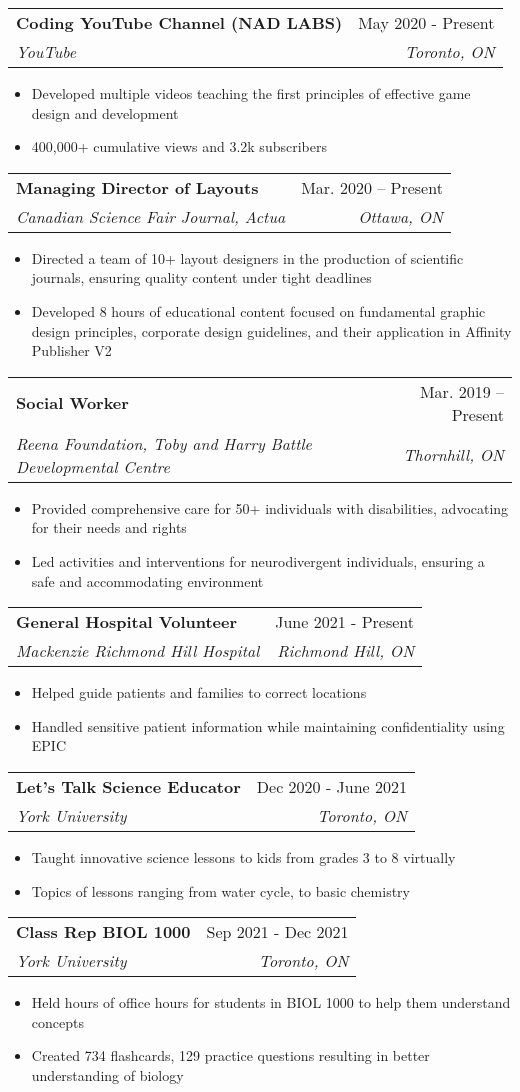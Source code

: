 \documentclass[letterpaper,11pt]{article}
\makeatletter
\newcommand{\resumeItem}[1]{
  \item\small{
    {#1 \vspace{-2pt}}
  }
}
\newcommand{\resumeSubheading}[4]{
  \vspace{-2pt}\item
    \begin{tabular*}{0.97\textwidth}[t]{l@{\extracolsep{\fill}}r}
      \textbf{#1} & #2 \\
      \textit{\small#3} & \textit{\small #4} \\
    \end{tabular*}\vspace{-7pt}
}
\newcommand{\resumeItemListStart}{\begin{itemize}}
\newcommand{\resumeItemListEnd}{\end{itemize}\vspace{-5pt}}
\makeatother
\begin{document}
    
    \resumeSubheading
      {Coding YouTube Channel (NAD LABS)}{May 2020 - Present}     
      {YouTube}{Toronto, ON}
      \resumeItemListStart
        \resumeItem{Developed multiple videos teaching the first principles of effective game design and development}
        \resumeItem{400,000+ cumulative views and 3.2k subscribers}
    \resumeItemListEnd
    
    \resumeSubheading
      {Managing Director of Layouts}{Mar. 2020 -- Present}
      {Canadian Science Fair Journal, Actua}{Ottawa, ON}
       \resumeItemListStart
        \resumeItem{Directed a team of 10+ layout designers in the production of scientific journals, ensuring quality content under tight deadlines}
        \resumeItem{Developed 8 hours of educational content focused on fundamental graphic design principles, corporate design guidelines, and their application in Affinity Publisher V2}

    \resumeItemListEnd


    \resumeSubheading
      {Social Worker}{Mar. 2019 -- Present}
      {Reena Foundation, Toby and Harry Battle Developmental Centre}{Thornhill, ON}
      \resumeItemListStart
        \resumeItem{Provided comprehensive care for 50+ individuals with disabilities, advocating for their needs and rights}
        \resumeItem{Led activities and interventions for neurodivergent individuals, ensuring a safe and accommodating environment}
    \resumeItemListEnd


    \resumeSubheading
      {General Hospital Volunteer}{June 2021 - Present}
      {Mackenzie Richmond Hill Hospital}{Richmond Hill, ON}
      \resumeItemListStart
        \resumeItem{Helped guide patients and families to correct locations}
        \resumeItem{Handled sensitive patient information while maintaining confidentiality using EPIC}
    \resumeItemListEnd





    
    \resumeSubheading
      {Let's Talk Science Educator}{Dec 2020 - June 2021}     
      {York University}{Toronto, ON}
      \resumeItemListStart
        \resumeItem{Taught innovative science lessons to kids from grades 3 to 8 virtually}
        \resumeItem{Topics of lessons ranging from water cycle, to basic chemistry}
    \resumeItemListEnd        
    
    \resumeSubheading
      {Class Rep BIOL 1000}{Sep 2021 - Dec 2021}     
      {York University}{Toronto, ON}
      \resumeItemListStart
        \resumeItem{Held hours of office hours for students in BIOL 1000 to help them understand concepts }
        \resumeItem{Created 734 flashcards, 129 practice questions resulting in better understanding of biology}
    \resumeItemListEnd    
    
\end{document}
